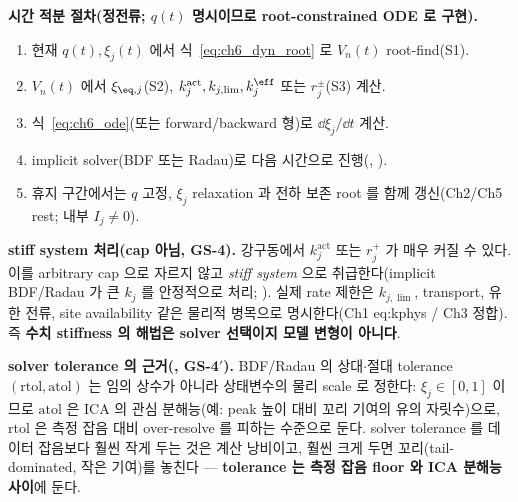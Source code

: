 \textbf{시간 적분 절차(정전류; $q(t)$ 명시이므로 root-constrained ODE 로 구현).}
\begin{enumerate}[label=T\arabic*),leftmargin=2.4em]
\item 현재 $q(t),\xi_j(t)$ 에서 식~\eqref{eq:ch6_dyn_root} 로 $V_n(t)$ root-find(S1).
\item $V_n(t)$ 에서 $\xi_{\eq,j}$(S2), $k_j^{\mathrm{act}},k_{j,\lim},k_j^{\eff}$ 또는 $r_j^\pm$(S3) 계산.
\item 식~\eqref{eq:ch6_ode}(또는 forward/backward 형)로 $\dd\xi_j/\dd t$ 계산.
\item implicit solver(BDF 또는 Radau)로 다음 시간으로 진행(, \cite{hindmarsh2005}).
\item 휴지 구간에서는 $q$ 고정, $\xi_j$ relaxation 과 전하 보존 root 를 함께 갱신(Ch2/Ch5 rest; 내부 $I_j\ne0$).
\end{enumerate}
\begin{boundbox}
\textbf{stiff system 처리(cap 아님, GS-4).} 강구동에서 $k_j^{\mathrm{act}}$ 또는 $r_j^+$ 가 매우 커질 수 있다.
이를 arbitrary cap 으로 자르지 않고 \emph{stiff system} 으로 취급한다(implicit BDF/Radau 가 큰 $k_j$ 를 안정적으로
처리; \cite{brenan1996,hindmarsh2005}). 실제 rate 제한은 $k_{j,\lim}$, transport, 유한 전류, site availability
같은 물리적 병목으로 명시한다(Ch1 eq:kphys / Ch3 정합). 즉 \textbf{수치 stiffness 의 해법은 solver 선택이지
모델 변형이 아니다}.
\end{boundbox}
\begin{verifybox}
\textbf{solver tolerance 의 근거(, GS-4$'$).} BDF/Radau 의 상대$\cdot$절대 tolerance $(\mathrm{rtol},
\mathrm{atol})$ 는 임의 상수가 아니라 상태변수의 물리 scale 로 정한다: $\xi_j\in[0,1]$ 이므로 $\mathrm{atol}$ 은
ICA 의 관심 분해능(예: peak 높이 대비 꼬리 기여의 유의 자릿수)으로, $\mathrm{rtol}$ 은 측정 잡음 대비 over-resolve
를 피하는 수준으로 둔다. solver tolerance 를 데이터 잡음보다 훨씬 작게 두는 것은 계산 낭비이고, 훨씬 크게 두면
꼬리(tail-dominated, 작은 기여)를 놓친다 — \textbf{tolerance 는 측정 잡음 floor 와 ICA 분해능 사이}에 둔다.
\end{verifybox}

